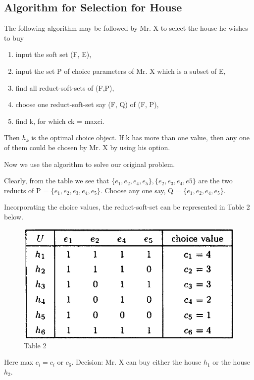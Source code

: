 \documentclass[12pt]{article} %
\begin{document}
\subsection{Algorithm for Selection for House}
The following algorithm may be followed by Mr. X to select the house he wishes to buy
\begin{enumerate}

\item{} input the soft set (F, E),
\item{} input the set P of choice parameters of Mr. X which is a subset of E,
\item{} find all reduct-soft-sets of (F,P),
\item{} choose one reduct-soft-set say (F, Q) of (F, P),
\item{}find k, for which ck = maxci.

\end{enumerate}
Then $h_k$ is the optimal choice object. If k has more than one value, then any one of them
could be chosen by Mr. X by using his option.


Now we use the algorithm to solve our original problem.


Clearly, from the table we see that $\{e_1,e_2,e_4,e_5\}, \{e_2,e_3,e_4,e5\}$ are the two reducts of P = $\{e_1,e_2,e_3,e_4,e_5\}$. Choose any one say, Q = $\{e_1,e_2,e_4,e_5\}$.


Incorporating the choice values, the reduct-soft-set can be represented in Table 2 below.


\begin{figure}[h!]
  \centering
   \includegraphics[scale=0.50]{table_2.png}
  \caption{Table 2}
\end{figure}

Here max $c_i = c_i$ or $c_6$.
Decision: Mr. X can buy either the house $h_1$ or the house $h_2$.
\end{document}
